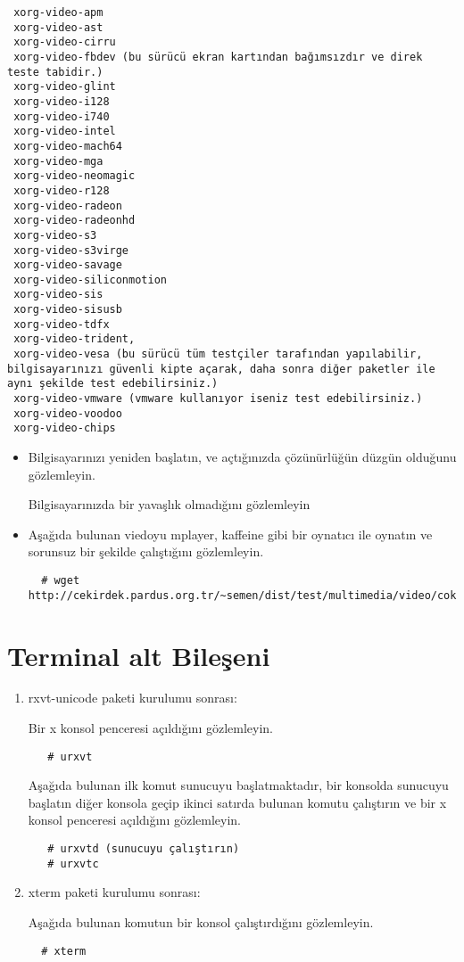 \documentclass[a4paper,10pt]{article}
\begin{document}
\begin{enumerate}
\begin{verbatim}
 xorg-video-apm 
 xorg-video-ast
 xorg-video-cirru
 xorg-video-fbdev (bu sürücü ekran kartından bağımsızdır ve direk teste tabidir.)
 xorg-video-glint
 xorg-video-i128
 xorg-video-i740
 xorg-video-intel
 xorg-video-mach64
 xorg-video-mga
 xorg-video-neomagic
 xorg-video-r128
 xorg-video-radeon
 xorg-video-radeonhd
 xorg-video-s3
 xorg-video-s3virge
 xorg-video-savage
 xorg-video-siliconmotion
 xorg-video-sis
 xorg-video-sisusb
 xorg-video-tdfx
 xorg-video-trident,
 xorg-video-vesa (bu sürücü tüm testçiler tarafından yapılabilir, bilgisayarınızı güvenli kipte açarak, daha sonra diğer paketler ile aynı şekilde test edebilirsiniz.)
 xorg-video-vmware (vmware kullanıyor iseniz test edebilirsiniz.)
 xorg-video-voodoo
 xorg-video-chips
\end{verbatim}

\begin{itemize}
 \item Bilgisayarınızı yeniden başlatın, ve açtığınızda çözünürlüğün düzgün olduğunu gözlemleyin.

 Bilgisayarınızda bir yavaşlık olmadığını gözlemleyin
 \item Aşağıda bulunan viedoyu mplayer, kaffeine gibi bir oynatıcı ile oynatın ve sorunsuz bir şekilde çalıştığını gözlemleyin.
 \begin{verbatim}
  # wget http://cekirdek.pardus.org.tr/~semen/dist/test/multimedia/video/cokluortam/DVD.mpg
 \end{verbatim}


\end{itemize}

\end{enumerate}

\section{Terminal alt Bileşeni}
\begin{enumerate}
 \item rxvt-unicode paketi kurulumu sonrası:

Bir x konsol penceresi açıldığını gözlemleyin.
  \begin{verbatim}
   # urxvt
  \end{verbatim}

Aşağıda bulunan ilk komut sunucuyu başlatmaktadır, bir konsolda sunucuyu başlatın diğer konsola geçip ikinci satırda bulunan komutu çalıştırın ve bir x konsol penceresi açıldığını gözlemleyin.
  \begin{verbatim}
   # urxvtd (sunucuyu çalıştırın)
   # urxvtc
  \end{verbatim}

\item xterm paketi kurulumu sonrası:

Aşağıda bulunan komutun bir konsol çalıştırdığını gözlemleyin.
 \begin{verbatim}
  # xterm
 \end{verbatim}

\end{enumerate}
\end{document}
